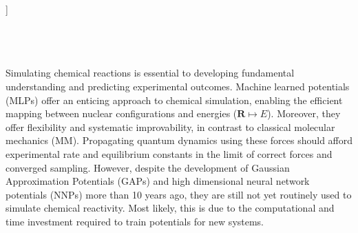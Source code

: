 \documentclass[twoside,twocolumn,9pt]{article}
\begin{document}
  ]

\renewcommand*\rmdefault{bch}\normalfont\upshape
\rmfamily
\section*{}
\vspace{-1cm}








\\%


\rmfamily %


Simulating chemical reactions is essential to developing fundamental understanding and predicting experimental outcomes.\cite{Orr-Ewing2017} Machine learned potentials (MLPs) offer an enticing approach to chemical simulation, enabling the efficient mapping between nuclear configurations and energies ($\boldsymbol{R} \mapsto E$). Moreover, they offer flexibility and systematic improvability, in contrast to classical molecular mechanics (MM).\cite{Behler2016} Propagating quantum dynamics using these forces should afford experimental rate and equilibrium constants in the limit of correct forces and converged sampling. However, despite the development of Gaussian Approximation Potentials (GAPs)\cite{Bartk2010, Deringer2021} and high dimensional neural network potentials (NNPs)\cite{Behler2007} more than 10 years ago, they are still not yet routinely used to simulate chemical reactivity.\cite{Ko2020} Most likely, this is due to the computational and time investment required to train potentials for new systems. 
\end{document}
